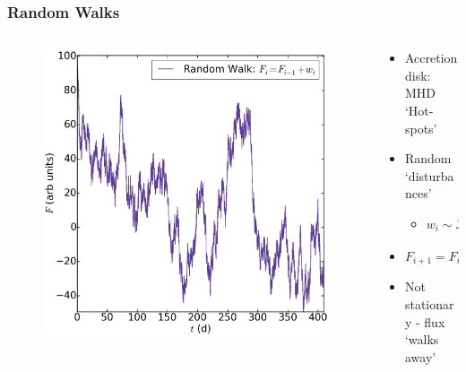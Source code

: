 \documentclass[hyperref={pdfpagelabels=false}]{beamer}
\begin{document}


\begin{frame}
\frametitle{Random Walks}
  \begin{columns}
    \centering
    \begin{column}{0.5\textwidth}
      \begin{figure}
        \includegraphics[scale=0.12]{images/RW_Illustration.jpg}
      \end{figure}
      \centering
    \end{column}
    \begin{column}{0.5\textwidth}
    \begin{itemize}
      \item Accretion disk: MHD `Hot-spots'
      \item Random `disturbances'
        \begin{itemize}
          \item $w_{i} \sim \mathcal{N}(0,\sigma^{2})$
        \end{itemize}
      \item $F_{i+1} = F_{i} + w_{i}$
      \item Not stationary - flux `walks away'
    \end{itemize}
    \end{column}
  \end{columns}
\end{frame}
\end{document}
